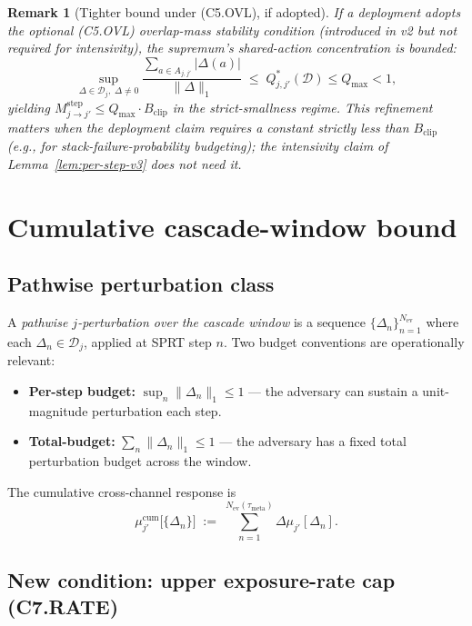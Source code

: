 \documentclass{article}
\newtheorem{remark}{Remark}
\newcommand{\Bclip}{B_{\mathrm{clip}}}
\newcommand{\Nev}{N_{\mathrm{ev}}}
\newcommand{\taumeta}{\tau_{\mathrm{meta}}}
\begin{document}
\begin{remark}[Tighter bound under (C5.OVL), if adopted]
\label{rem:tighter-v3}
If a deployment adopts the optional (C5.OVL) overlap-mass
stability condition (introduced in v2 but \emph{not} required for
intensivity), the supremum's shared-action concentration is
bounded:
\[
  \sup_{\Delta \in \mathcal{D}_j,\; \Delta \neq 0}
  \frac{\sum_{a \in A_{j, j'}} |\Delta(a)|}{\|\Delta\|_1}
  \;\leq\; Q^*_{j, j'}(\mathcal{D}) \leq Q_{\max} < 1,
\]
yielding $M_{j \to j'}^{\mathrm{step}} \leq Q_{\max} \cdot \Bclip$
in the strict-smallness regime.  This refinement matters when the
deployment claim requires a constant strictly less than $\Bclip$
(e.g., for stack-failure-probability budgeting); the intensivity
claim of Lemma~\ref{lem:per-step-v3} does not need it.
\end{remark}

\section{Cumulative cascade-window bound}

\subsection{Pathwise perturbation class}

A \emph{pathwise $j$-perturbation over the cascade window} is a
sequence $\{\Delta_n\}_{n=1}^{\Nev}$ where each
$\Delta_n \in \mathcal{D}_j$, applied at SPRT step $n$.  Two
budget conventions are operationally relevant:

\begin{itemize}
\item \textbf{Per-step budget:} $\sup_n \|\Delta_n\|_1 \leq 1$ ---
  the adversary can sustain a unit-magnitude perturbation each
  step.
\item \textbf{Total-budget:} $\sum_n \|\Delta_n\|_1 \leq 1$ --- the
  adversary has a fixed total perturbation budget across the
  window.
\end{itemize}

The cumulative cross-channel response is
\[
  \mu_{j'}^{\mathrm{cum}}\big[\{\Delta_n\}\big]
  \;:=\; \sum_{n=1}^{\Nev(\taumeta)} \Delta\mu_{j'}[\Delta_n].
\]

\subsection{New condition: upper exposure-rate cap (C7.RATE)}
\end{document}
